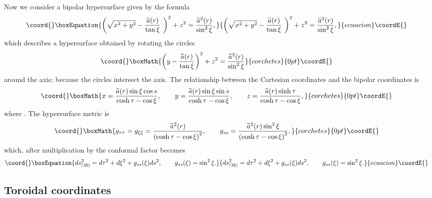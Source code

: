 \documentclass[a4paper,preprint,prabib,aps]{revtex4}
\begin{document}
Now we consider a bipolar hypersurface given by the formula
\begin{equation}\coord{}\boxEquation{
\left( \sqrt{x^{2}+y^{2}}-\frac{\widetilde{a}(r)}{\tan \xi }\ \right)
^{2}+z^{2}=\frac{\widetilde{a}^{2}(r)}{\sin ^{2}\xi },  \label{bip}
}{
\left( \sqrt{x^{2}+y^{2}}-\frac{\widetilde{a}(r)}{\tan \xi }\ \right)
^{2}+z^{2}=\frac{\widetilde{a}^{2}(r)}{\sin ^{2}\xi },  }{ecuacion}\coordE{}\end{equation}
which describes a hypersurface obtained by rotating the circles
\[\coord{}\boxMath{
\left( y-\frac{\widetilde{a}(r)}{\tan \xi }\right) ^{2}+z^{2}=\frac{%
\widetilde{a}^{2}(r)}{\sin ^{2}\xi }
}{corchetes}{0pt}\coordE{}\]
around the \coordHE{} axis; because \coordHE{} the
circles intersect the \coordHE{} axis. The relationship between the Cartesian
coordinates and the bipolar coordinates is
\[\coord{}\boxMath{
x=\frac{\widetilde{a}(r)\sin \xi \cos s}{\cosh \tau -\cos \xi },\qquad y=%
\frac{\widetilde{a}(r)\sin \xi \sin s}{\cosh \tau -\cos \xi },\qquad z=\frac{%
\widetilde{a}(r)\sinh \tau }{\cosh \tau -\cos \xi },
}{corchetes}{0pt}\coordE{}\]
where \coordHE{}. The
hypersurface metric is
\[\coord{}\boxMath{
g_{\tau \tau }=g_{\xi \xi }=\frac{\widetilde{a}^{2}(r)}{\left( \cosh \tau
-\cos \xi \right) ^{2}},\qquad g_{ss}=\frac{\widetilde{a}^{2}(r)\sin ^{2}\xi
}{\left( \cosh \tau -\cos \xi \right) ^{2}},
}{corchetes}{0pt}\coordE{}\]
which, after multiplication by the conformal factor \coordHE{} becomes
\begin{equation}\coord{}\boxEquation{
ds_{(3b)}^{2}=d\tau ^{2}+d\xi ^{2}+g_{ss}(\xi )ds^{2},\qquad g_{ss}(\xi
)=\sin ^{2}\xi .  \label{mbipcy}
}{
ds_{(3b)}^{2}=d\tau ^{2}+d\xi ^{2}+g_{ss}(\xi )ds^{2},\qquad g_{ss}(\xi
)=\sin ^{2}\xi .  }{ecuacion}\coordE{}\end{equation}

\subsection{Toroidal coordinates}
\end{document}
